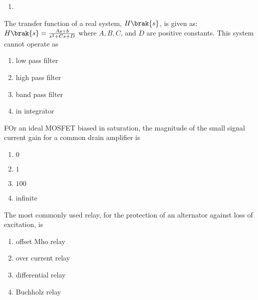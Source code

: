 {\begin{enumerate}
{\begin{figure}[!ht]
\label{fig:my_label}
\end{figure}
}
\item{
\begin{figure}[!ht]
\centering
{}%

\label{fig:my_label}
\end{figure}
}
\end{enumerate}
}
\item{
The transfer function of a real system, $H\brak{s}$, is given as: $H\brak{s}=\frac{As+b}{s^2+Cs+D}$ where $A,B,C$, and $D$ are positive constants. This system cannot operate as 
\begin{multicols}{4}
\begin{enumerate}
\item low pass filter
\item high pass filter
\item band pass filter
\item in integrator
\end{enumerate}
\end{multicols}
}
\item{
FOr an ideal MOSFET biased in saturation, the magnitude of the small signal current gain for a common drain amplifier is
\begin{multicols}{4}
\begin{enumerate}
\item $0$
\item $1$
\item $100$
\item infinite
\end{enumerate}
\end{multicols}
}
\item{
The most commonly used relay, for the protection of an alternator against loss of excitation, is
\begin{multicols}{2}
    \begin{enumerate}
        \item offset Mho relay
        \item over current relay
        \item differential relay
        \item Buchholz relay
    \end{enumerate}
\end{multicols}
}
